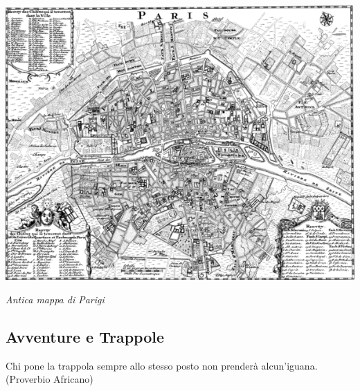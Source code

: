\vfill

\begin{center}
\includegraphics[width=0.9\linewidth]{immagini/mappaparigi.png}

\emph{Antica mappa di Parigi}
\end{center}

\pagebreak

\subsection{Avventure e Trappole}\label{trappole}

\begin{enfasi}{
Chi pone la trappola sempre allo stesso posto non prenderà alcun'iguana. (Proverbio Africano)}\end{enfasi}

